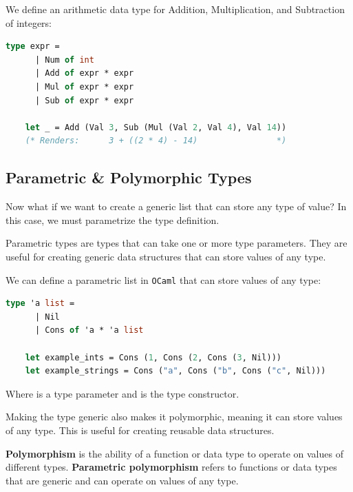 \vspace{-1em}
\begin{Example}

    We define an arithmetic data type for Addition, Multiplication, and Subtraction of integers:
    \begin{lstlisting}[language=OCaml, caption={Arithmetic Expression Definition}, numbers=none]
    type expr =
      | Num of int
      | Add of expr * expr
      | Mul of expr * expr
      | Sub of expr * expr
    
    let _ = Add (Val 3, Sub (Mul (Val 2, Val 4), Val 14))
    (* Renders:      3 + ((2 * 4) - 14)                *)
    \end{lstlisting}
\end{Example}

\subsection{Parametric \& Polymorphic Types}
\noindent
Now what if we want to create a generic list that can store any type of value? In this case, we must parametrize the type definition.
\begin{Def}

    Parametric types are types that can take one or more type parameters. They are useful for creating generic data structures that can store values of any type.
\end{Def}

\newpage 

\begin{Example}

    We can define a parametric list in \texttt{OCaml} that can store values of any type:
    \begin{lstlisting}[language=OCaml, caption={Parametric List Definition}, numbers=none]
    type 'a list =
      | Nil
      | Cons of 'a * 'a list

    let example_ints = Cons (1, Cons (2, Cons (3, Nil)))
    let example_strings = Cons ("a", Cons ("b", Cons ("c", Nil)))
    \end{lstlisting}

    \noindent
    Where  is a type parameter and  is the type constructor.
\end{Example}

\noindent
Making the type generic also makes it polymorphic, meaning it can store values of any type. This is useful for creating reusable data structures.
\begin{Def}

    \textbf{Polymorphism} is the ability of a function or data type to operate on values of different types. \textbf{Parametric polymorphism} refers to functions or data types that are generic and can operate on values of any type.
\end{Def}

